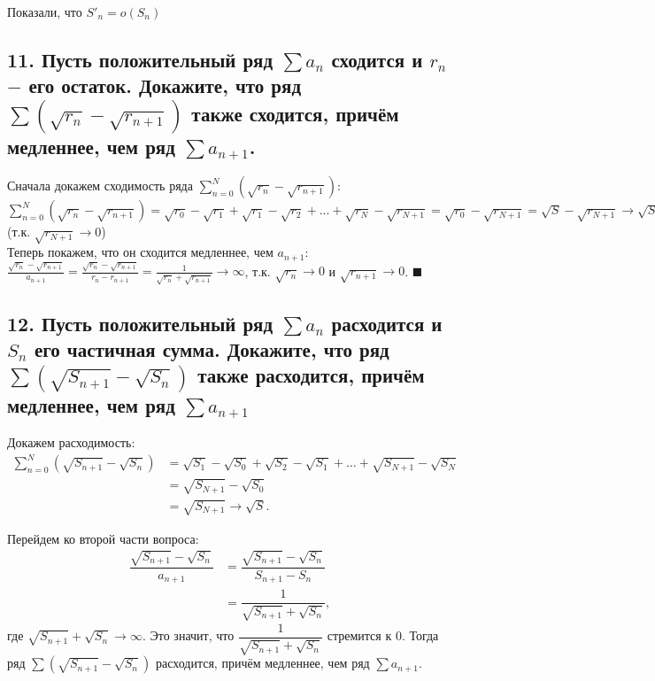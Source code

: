 \documentclass[a4paper, fleqn]{article}
\begin{document}
        Показали, что $S'_n=o(S_n)$
    \subsection*{11. Пусть положительный ряд $\sum a_n$ сходится и $r_n$ $-$ его остаток. Докажите, что ряд $\sum(\sqrt{r_n} - \sqrt{r_{n + 1}})$ также сходится, причём медленнее, чем ряд $\sum a_{n + 1}$.}
    Сначала докажем сходимость ряда $\sum\limits_{n = 0}^N (\sqrt{r_n} - \sqrt{r_{n + 1}})$:\\
    $\sum\limits_{n = 0}^N (\sqrt{r_n} - \sqrt{r_{n + 1}}) = \sqrt{r_0} - \sqrt{r_1} + \sqrt{r_1} - \sqrt{r_2} + ... + \sqrt{r_N} - \sqrt{r_{N+1}} = \sqrt{r_0} - \sqrt{r_{N+1}} = \sqrt{S} - \sqrt{r_{N+1}} \rightarrow \sqrt{S}$ (т.к. $\sqrt{r_{N+1}} \rightarrow 0$) \\
    Теперь покажем, что он сходится медленнее, чем $a_{n+1}$: \\
    $\frac{\sqrt{r_n} - \sqrt{r_{n + 1}}}{a_{n+1}} = \frac{\sqrt{r_n} - \sqrt{r_{n + 1}}}{r_n - r_{n+1}} = \frac{1}{\sqrt{r_n} + \sqrt{r_{n + 1}}} \rightarrow \infty$, т.к. $\sqrt{r_n} \rightarrow 0$ и $\sqrt{r_{n + 1}} \rightarrow 0$. $\blacksquare$ \\
    
        \subsection*{12. Пусть положительный ряд $\sum a_n$ расходится и $S_n$ его частичная сумма. Докажите, что ряд $\sum (\sqrt{S_{n+1}} - \sqrt{S_n})$ также расходится, причём медленнее, чем ряд $\sum a_{n+1}$}

        Докажем расходимость:
        \begin{align*}
            \sum_{n=0}^{N} (\sqrt{S_{n+1}} - \sqrt{S_n}) 
            &= \sqrt{S_1} - \sqrt{S_0} + \sqrt{S_2} - \sqrt{S_1} + \dots + \sqrt{S_{N+1}} - \sqrt{S_{N}} \\
            &= \sqrt{S_{N+1}} - \sqrt{S_0} \\
            &= \sqrt{S_{N+1}} \to \sqrt{S}.
        \end{align*}

        Перейдем ко второй части вопроса:
        \begin{align*}
            \dfrac{\sqrt{S_{n+1}} - \sqrt{S_n}}{a_{n+1}} 
            &= \dfrac{\sqrt{S_{n+1}} - \sqrt{S_n}}{S_{n+1} - S_n} \\
            &= \dfrac{1}{\sqrt{S_{n+1}} + \sqrt{S_n}},
        \end{align*}
        где $\sqrt{S_{n+1}} + \sqrt{S_n} \to \infty$. Это значит, что $\dfrac{1}{\sqrt{S_{n+1}} + \sqrt{S_n}}$ стремится к $0$. Тогда ряд $\sum (\sqrt{S_{n+1}} - \sqrt{S_n})$ расходится, причём медленнее, чем ряд $\sum a_{n+1}$.
    
\end{document}
